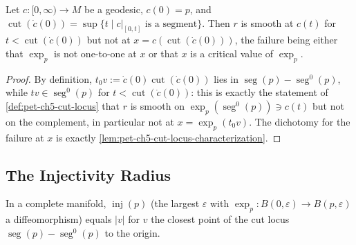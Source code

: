 \begin{corollary}
  \label{cor:pet-ch5-cut-locus-smoothness}
  Let $c:[0,\infty)\to M$ be a geodesic, $c(0)=p$, and
  $\operatorname{cut}(\dot c(0))=\sup\{t\mid c|_{[0,t]}\text{ is a segment}\}$. Then
  $r$ is smooth at $c(t)$ for $t<\operatorname{cut}(\dot c(0))$ but not at
  $x=c(\operatorname{cut}(\dot c(0)))$, the failure being either that $\exp_p$ is
  not one-to-one at $x$ or that $x$ is a critical value of $\exp_p$.
\end{corollary}
\begin{proof}
  By definition, $t_0v:=\dot c(0)\operatorname{cut}(\dot c(0))$ lies in
  $\operatorname{seg}(p)-\operatorname{seg}^0(p)$, while $tv\in
  \operatorname{seg}^0(p)$ for $t<\operatorname{cut}(\dot c(0))$: this is exactly
  the statement of \cref{def:pet-ch5-cut-locus} that $r$ is smooth on
  $\exp_p(\operatorname{seg}^0(p))\ni c(t)$ but not on the complement, in
  particular not at $x=\exp_p(t_0v)$. The dichotomy for the failure at $x$ is
  exactly \cref{lem:pet-ch5-cut-locus-characterization}.
\end{proof}

\subsection{The Injectivity Radius}

\begin{remark}
  \label{rem:pet-ch5-injectivity-radius-cut-locus}
  In a complete manifold, $\operatorname{inj}(p)$ (the largest $\varepsilon$ with
  $\exp_p:B(0,\varepsilon)\to B(p,\varepsilon)$ a diffeomorphism) equals $|v|$ for
  $v$ the closest point of the cut locus
  $\operatorname{seg}(p)-\operatorname{seg}^0(p)$ to the origin.
\end{remark}

